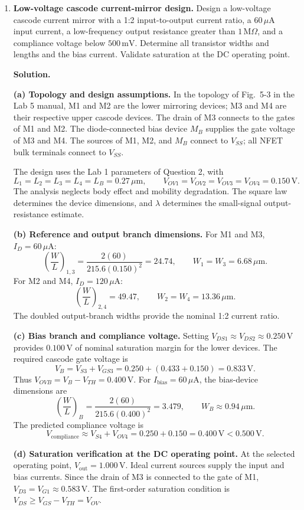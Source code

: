 \documentclass[12pt,letterpaper]{article}
\begin{document}
\begin{enumerate}
\newpage
\item \textbf{Low-voltage cascode current-mirror design.}
Design a low-voltage cascode current mirror with a 1:2 input-to-output
current ratio, a $60\,\mu\mathrm{A}$ input current, a low-frequency
output resistance greater than $1\,\mathrm{M}\Omega$, and a compliance
voltage below $500\,\mathrm{mV}$. Determine all transistor widths and
lengths and the bias current. Validate saturation at the DC operating point.

\textbf{Solution.}

\textbf{(a) Topology and design assumptions.}
In the topology of Fig.~5-3 in the Lab 5 manual, M1 and M2 are the
lower mirroring devices; M3 and M4 are their respective upper cascode
devices. The drain of M3 connects to the gates of M1 and M2.
The diode-connected bias device $M_B$ supplies the gate voltage of
M3 and M4. The sources of M1, M2, and $M_B$ connect to $V_{SS}$;
all NFET bulk terminals connect to $V_{SS}$.

The design uses the Lab 1 parameters of Question 2, with
\[
L_1=L_2=L_3=L_4=L_B=0.27\,\mu\mathrm{m},\qquad
V_{OV1}=V_{OV2}=V_{OV3}=V_{OV4}=0.150\,\mathrm{V}.
\]
The analysis neglects body effect and mobility degradation. The
square law determines the device dimensions, and $\lambda$ determines
the small-signal output-resistance estimate.

\textbf{(b) Reference and output branch dimensions.}
For M1 and M3, $I_D=60\,\mu\mathrm{A}$:
\[
\left(\frac WL\right)_{1,3}
=\frac{2(60)}{215.6(0.150)^2}=24.74,
\qquad W_1=W_3=6.68\,\mu\mathrm{m}.
\]
For M2 and M4, $I_D=120\,\mu\mathrm{A}$:
\[
\left(\frac WL\right)_{2,4}=49.47,
\qquad W_2=W_4=13.36\,\mu\mathrm{m}.
\]
The doubled output-branch widths provide the nominal 1:2 current ratio.

\textbf{(c) Bias branch and compliance voltage.}
Setting $V_{DS1}\approx V_{DS2}\approx0.250\,\mathrm{V}$ provides
$0.100\,\mathrm{V}$ of nominal saturation margin for the lower devices.
The required cascode gate voltage is
\[
V_B=V_{S3}+V_{GS3}=0.250+(0.433+0.150)=0.833\,\mathrm{V}.
\]
Thus $V_{OVB}=V_B-V_{TH}=0.400\,\mathrm{V}$. For
$I_{\mathrm{bias}}=60\,\mu\mathrm{A}$, the bias-device dimensions are
\[
\left(\frac WL\right)_B
=\frac{2(60)}{215.6(0.400)^2}=3.479,
\qquad \boxed{W_B\approx0.94\,\mu\mathrm{m}.}
\]
The predicted compliance voltage is
\[
\boxed{V_{\mathrm{compliance}}\approx V_{S4}+V_{OV4}
=0.250+0.150=0.400\,\mathrm{V}<0.500\,\mathrm{V}.}
\]

\newpage
\textbf{(d) Saturation verification at the DC operating point.}
At the selected operating point, $V_{\mathrm{out}}=1.000\,\mathrm{V}$.
Ideal current sources supply the input and bias
currents. Since the drain of M3 is connected to the gate of M1,
$V_{D3}=V_{G1}\approx0.583\,\mathrm{V}$. The first-order saturation
condition is $V_{DS}\ge V_{GS}-V_{TH}=V_{OV}$.


\end{enumerate}
\end{document}
